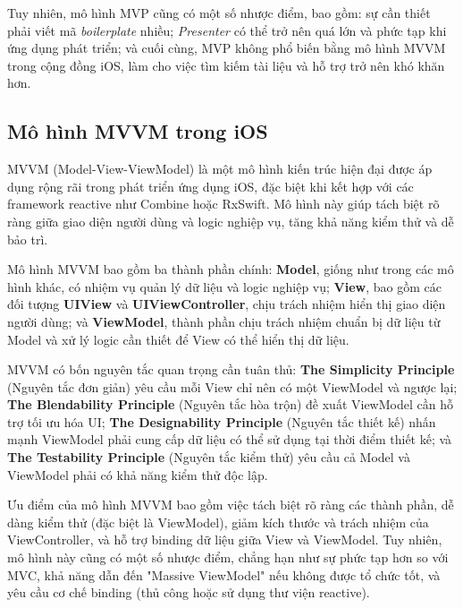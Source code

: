   Tuy nhiên, mô hình MVP cũng có một số nhược điểm, bao gồm: sự cần thiết phải viết mã \textit{boilerplate} nhiều; \textit{Presenter} có thể trở nên quá lớn và phức tạp khi ứng dụng phát triển; và cuối cùng, MVP không phổ biến bằng mô hình MVVM trong cộng đồng iOS, làm cho việc tìm kiếm tài liệu và hỗ trợ trở nên khó khăn hơn.

\subsection{Mô hình MVVM trong iOS}

MVVM (Model-View-ViewModel) là một mô hình kiến trúc hiện đại được áp dụng rộng rãi trong phát triển ứng dụng iOS, đặc biệt khi kết hợp với các framework reactive như Combine hoặc RxSwift. Mô hình này giúp tách biệt rõ ràng giữa giao diện người dùng và logic nghiệp vụ, tăng khả năng kiểm thử và dễ bảo trì.

\vspace{0.5em}

  Mô hình MVVM bao gồm ba thành phần chính: \textbf{Model}, giống như trong các mô hình khác, có nhiệm vụ quản lý dữ liệu và logic nghiệp vụ; \textbf{View}, bao gồm các đối tượng \textbf{UIView} và \textbf{UIViewController}, chịu trách nhiệm hiển thị giao diện người dùng; và \textbf{ViewModel}, thành phần chịu trách nhiệm chuẩn bị dữ liệu từ Model và xử lý logic cần thiết để View có thể hiển thị dữ liệu.

  \vspace{0.5em}

  MVVM có bốn nguyên tắc quan trọng cần tuân thủ: \textbf{The Simplicity Principle} (Nguyên tắc đơn giản) yêu cầu mỗi View chỉ nên có một ViewModel và ngược lại; \textbf{The Blendability Principle} (Nguyên tắc hòa trộn) đề xuất ViewModel cần hỗ trợ tối ưu hóa UI; \textbf{The Designability Principle} (Nguyên tắc thiết kế) nhấn mạnh ViewModel phải cung cấp dữ liệu có thể sử dụng tại thời điểm thiết kế; và \textbf{The Testability Principle} (Nguyên tắc kiểm thử) yêu cầu cả Model và ViewModel phải có khả năng kiểm thử độc lập.

  \vspace{0.5em}

  Ưu điểm của mô hình MVVM bao gồm việc tách biệt rõ ràng các thành phần, dễ dàng kiểm thử (đặc biệt là ViewModel), giảm kích thước và trách nhiệm của ViewController, và hỗ trợ binding dữ liệu giữa View và ViewModel. Tuy nhiên, mô hình này cũng có một số nhược điểm, chẳng hạn như sự phức tạp hơn so với MVC, khả năng dẫn đến "Massive ViewModel" nếu không được tổ chức tốt, và yêu cầu cơ chế binding (thủ công hoặc sử dụng thư viện reactive).

